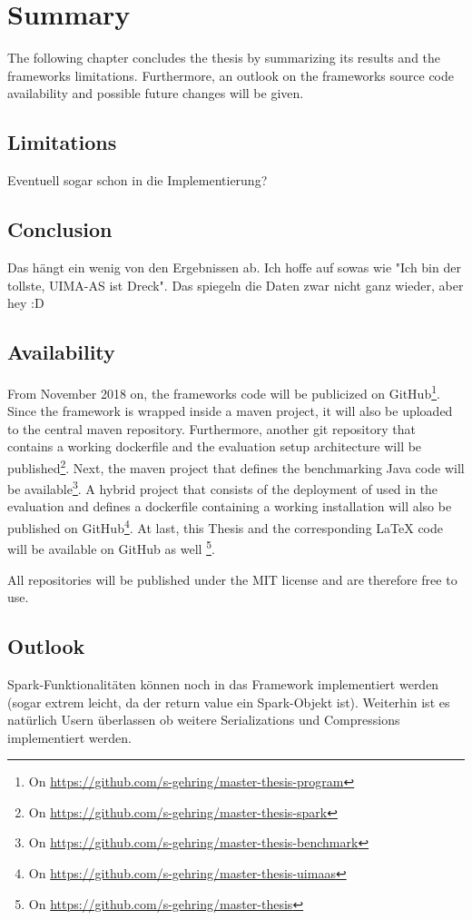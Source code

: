 \chapter{Summary}\label{ch:summary}
The following chapter concludes the thesis by summarizing its results and the frameworks limitations. Furthermore, an outlook on the frameworks source code availability and possible future changes will be given.

\section{Limitations}
Eventuell sogar schon in die Implementierung?

\section{Conclusion}

Das hängt ein wenig von den Ergebnissen ab. Ich hoffe auf sowas wie "Ich bin der tollste, UIMA-AS ist Dreck". Das spiegeln die Daten zwar nicht ganz wieder, aber hey :D


\section{Availability}
From November 2018 on, the frameworks code will be publicized on GitHub\footnote{On \url{https://github.com/s-gehring/master-thesis-program}}. Since the framework is wrapped inside a maven project, it will also be uploaded to the central maven repository. Furthermore, another git repository that contains a working \spark{} dockerfile and the evaluation setup architecture will be published\footnote{On \url{https://github.com/s-gehring/master-thesis-spark}}. Next, the maven project that defines the benchmarking Java code will be available\footnote{On \url{https://github.com/s-gehring/master-thesis-benchmark}}. A hybrid project that consists of the deployment of \uimaas{} used in the evaluation and defines a dockerfile containing a working \uimaas{} installation will also be published on GitHub\footnote{On \url{https://github.com/s-gehring/master-thesis-uimaas}}. At last, this Thesis and the corresponding \LaTeX{} code will be available on GitHub as well \footnote{On \url{https://github.com/s-gehring/master-thesis}}.

All repositories will be published under the MIT license and are therefore free to use.

\section{Outlook}

Spark-Funktionalitäten können noch in das Framework implementiert werden (sogar extrem leicht, da der return value ein Spark-Objekt ist). Weiterhin ist es natürlich Usern überlassen ob weitere Serializations und Compressions implementiert werden.
